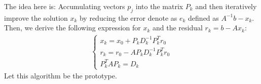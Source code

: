 \documentclass[]{article}
\theoremstyle{definition}
\begin{document}
            The idea here is: Accumulating vectors $p_j$ into the matrix $P_k$ and then iteratively improve the solution $x_k$ by reducing the error denote as $e_k$ defined as $A^{-1}b - x_k$. Then, we derive the following expression for $x_k$ and the residual $r_k = b - Ax_k$: 
            \begin{align}
                \begin{cases}
                    x_k = x_0 + P_kD^{-1}_kP^T_kr_0
                    \\
                    r_k = r_0 - AP_kD^{-1}_kP^T_k r_0
                    \\
                    P^T_kAP_k = D_k
                \end{cases}
            \end{align}
            Let this algorithm be the prototype. 
\end{document}
